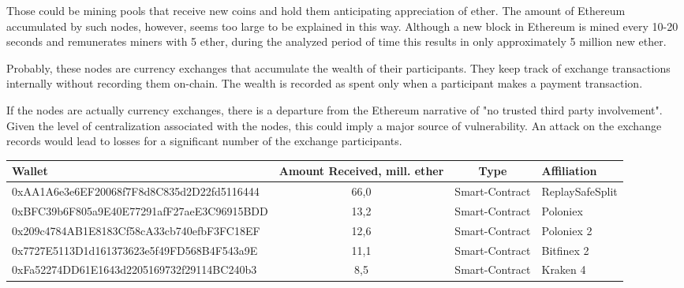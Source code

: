 Those could be mining pools that receive new coins and hold them anticipating appreciation of ether.
The amount of Ethereum accumulated by such nodes, however, seems too large to be explained in this way.
Although a new block in Ethereum is mined every 10-20 seconds and remunerates miners with 5 ether, during the analyzed period of time this results in only approximately 5 million new ether.

Probably, these nodes are currency exchanges that accumulate the wealth of their participants. 
They keep track of exchange transactions internally without recording them on-chain. 
The wealth is recorded as spent only when a participant makes a payment transaction.

If the nodes are actually currency exchanges, there is a departure from the Ethereum narrative of "no trusted third party involvement".
Given the level of centralization associated with the nodes, this could imply a major source of vulnerability.
An attack on the exchange records would lead to losses for a significant number of the exchange participants.

\begin{table}
\centering
{} 
\label{tab:t5mr} 
\begin{adjustbox}{width=0.9\linewidth}
\begin{tabular}{lccl}
  \hline
Wallet & Amount Received, mill. ether & Type & Affiliation \\
  \hline
  0xAA1A6e3e6EF20068f7F8d8C835d2D22fd5116444 & 66,0 & Smart-Contract & ReplaySafeSplit \\ 
  0xBFC39b6F805a9E40E77291afF27aeE3C96915BDD & 13,2 & Smart-Contract & Poloniex \\ 
  0x209c4784AB1E8183Cf58cA33cb740efbF3FC18EF & 12,6 & Smart-Contract & Poloniex 2 \\ 
  0x7727E5113D1d161373623e5f49FD568B4F543a9E & 11,1 & Smart-Contract & Bitfinex 2 \\ 
  0xFa52274DD61E1643d2205169732f29114BC240b3 & 8,5 & Smart-Contract & Kraken 4 \\ 
   \hline
\end{tabular}
\end{adjustbox}
\end{table}

